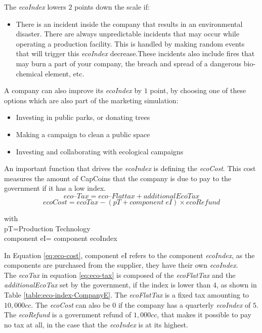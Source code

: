 The \textit{ecoIndex} lowers $2$ points down the scale if: 
\begin{itemize}
	\item There is an incident inside the company that results in an environmental disaster. There are always unpredictable incidents that may occur while operating a production facility. This is handled by making random events that will trigger this \textit{ecoIndex} decrease.These incidents also include fires that may burn a part of your company, the breach and spread of a dangerous bio-chemical element, etc.
\end{itemize}

A company can also improve its \textit{ecoIndex} by $1$ point, by choosing one of these options which are also part of the marketing simulation: 
\begin{itemize}
\item Investing in public parks, or donating trees
\item Making a campaign to clean a public space
\item Investing and collaborating with ecological campaigns
\end{itemize}

An important function that drives the \textit{ecoIndex} is defining the \textit{ecoCost}. This cost measures the amount of CapCoins that the company is due to pay to the government if it has a low index. \\ 
\begin{equation}
eco–Tax= eco–Flat tax+ additionalEcoTax
\label{eq:eco-tax}
\end{equation}
\begin{equation}
ecoCost= ecoTax - (pT + component \; eI)\times ecoRefund 
\label{eq:eco-cost}
\end{equation}
\begin{center}
with\\
	pT=Production Technology\\
	component eI= component ecoIndex\\
\end{center}

In Equation \ref{eq:eco-cost}, component eI refers to the component  \textit{ecoIndex}, as the components are purchased from the supplier, they have their own \textit{ecoIndex}.\\
The \textit{ecoTax} in equation \ref{eq:eco-tax} is composed of the \textit{ecoFlatTax} and the \textit{additionalEcoTax} set by the government, if the index is lower than $4$, as shown in Table \ref{table:eco-index-CompanyE}.
The \textit{ecoFlatTax} is a fixed tax amounting to $10,000cc$. The \textit{ecoCost} can also be $0$ if the company has a quarterly  \textit{ecoIndex} of $5$. The  \textit{ecoRefund} is a government refund of $1,000cc$, that makes it possible to pay no tax at all, in the case that the \textit{ecoIndex} is at its highest. 